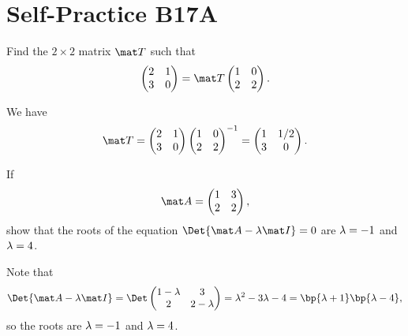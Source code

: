 \section{Self-Practice B17A}

\begin{problem}
    Find the $2 \times 2$ matrix $\mat T$ such that \[\begin{pmatrix}2 & 1 \\ 3 & 0\end{pmatrix} = \mat T \begin{pmatrix}1 & 0 \\ 2 & 2\end{pmatrix}.\]
\end{problem}
\begin{solution}
    We have \[\mat T = \begin{pmatrix}2 & 1 \\ 3 & 0\end{pmatrix}\begin{pmatrix}1 & 0 \\ 2 & 2\end{pmatrix}^{-1} = \begin{pmatrix}1 & 1/2 \\ 3 & 0\end{pmatrix}.\]
\end{solution}

\begin{problem}
    If \[\mat A = \begin{pmatrix}1 & 3 \\ 2 & 2\end{pmatrix},\] show that the roots of the equation $\Det{\mat A - \l \mat I} = 0$ are $\lambda = -1$ and $\lambda = 4$.
\end{problem}
\begin{solution}
    Note that \[\Det{\mat A - \l \mat I} = \Det \begin{pmatrix}1 - \l & 3 \\ 2 & 2 - \l\end{pmatrix} = \l^2 - 3\l - 4 = \bp{\l + 1}\bp{\l - 4},\] so the roots are $\lambda = -1$ and $\lambda = 4$.
\end{solution}

